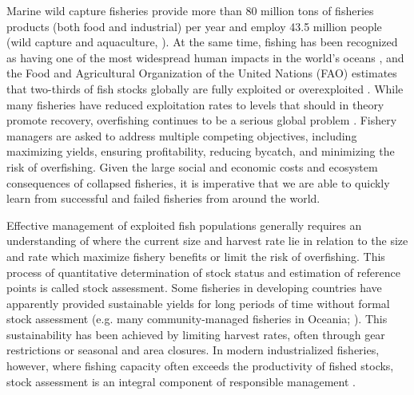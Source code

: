


Marine wild capture fisheries provide more than 80 million tons of
fisheries products (both food and industrial) per year and employ 43.5
million people (wild capture and aquaculture, \citep{FAO:sofia}).
At the same time, fishing has been recognized as having one of the
most widespread human impacts in the world's oceans
\citep{Halpern:etal:2008:science}, and the Food and Agricultural
Organization of the United Nations (FAO) estimates that two-thirds of
fish stocks globally are fully exploited or overexploited
\citep{FAO:sofia}. While many fisheries have reduced exploitation
rates to levels that should in theory promote recovery, overfishing continues to
be a serious global problem \citep{Worm:etal:2009:science}. Fishery
managers are asked to address multiple competing objectives, including
maximizing yields, ensuring profitability, reducing bycatch, and
minimizing the risk of overfishing. Given the large social and
economic costs \citep{Rice:etal:2003:icescm} and ecosystem
consequences \citep{Frank:etal:2005:science, Myers:etal:2007:science}
of collapsed fisheries, it is imperative that we are able to quickly
learn from successful and failed fisheries from around the world.

Effective management of exploited fish populations generally requires
an understanding of where the current size and harvest rate lie in
relation to the size and rate which maximize fishery benefits or limit
the risk of overfishing. This process of quantitative determination of
stock status and estimation of reference points is called stock
assessment. Some fisheries in developing countries have apparently
provided sustainable yields for long periods of time without formal
stock assessment (e.g. many community-managed fisheries in Oceania;
\cite{Dalzell:1998:coastmgmt}). This sustainability has been achieved
by limiting harvest rates, often through gear restrictions or seasonal
and area closures. In modern industrialized fisheries, however, where
fishing capacity often exceeds the productivity of fished stocks,
stock assessment is an integral component of responsible management
\citep{Hilborn:Walters:1992}.

